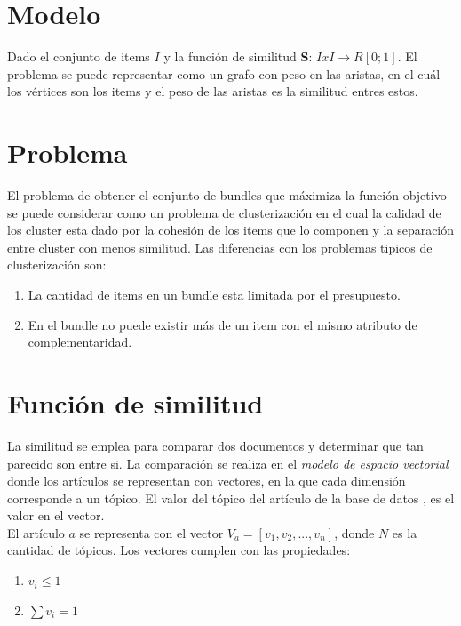 
\section{Modelo}
Dado el conjunto de items $I$ y la función de similitud \textbf{S}: $I x I\rightarrow R[0;1]$. El problema se puede representar como un grafo con peso en las aristas, en el cuál los vértices son los items y el peso de las aristas es la similitud entres estos.
\section{Problema}
El problema de obtener el conjunto de bundles que máximiza la función objetivo se puede considerar como un problema de clusterización en el cual la calidad de los cluster esta dado por la cohesión de los items que lo componen y la separación entre cluster con menos similitud. Las diferencias con los problemas tipicos de clusterización son:
\begin{enumerate}
 \item La cantidad de items en un bundle esta limitada por el presupuesto.
 \item En el bundle no puede existir más de un item con el mismo atributo de complementaridad.
\end{enumerate}
\section{Función de similitud}
La similitud se emplea para comparar dos documentos y determinar que tan parecido son entre si. La comparación se realiza en el \textit{modelo de espacio vectorial} donde los artículos se representan con vectores, en la que cada dimensión corresponde a un tópico. El valor del tópico del artículo de la base de datos \cite{dataDrive}, es el valor en el vector.\\
El artículo $a$ se representa con el vector $V_a = [v_1,v_2,...,v_n]$, donde $N$ es la cantidad de tópicos. Los vectores cumplen con las propiedades:
\begin{enumerate}
 \item $v_i \leqslant 1$
 \item $\sum{v_i} = 1$
\end{enumerate}

